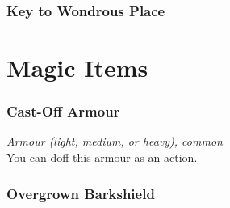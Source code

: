 \subsection*{Key to Wondrous Place}\label{mi:WondrousPlaceKey}



\chapter*{Magic Items}
\subsection*{Cast-Off Armour}\label{mi:CastOffArmour}

\textit{Armour (light, medium, or heavy), common}\\
{\entryfont You can doff this armour as an action.}

\subsection*{Overgrown Barkshield}\label{mi:OvergrownBarkshield}

